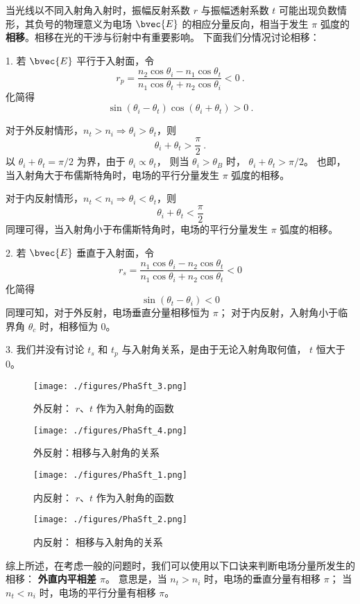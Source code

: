 
\begin{issues}
\issueMissDepend
\end{issues}


当光线以不同入射角入射时，振幅反射系数 $r$ 与振幅透射系数 $t$  可能出现负数情形，其负号的物理意义为电场 $\bvec{E}$ 的相应分量反向，相当于发生 $\pi$ 弧度的\textbf{相移}。相移在光的干涉与衍射中有重要影响。
下面我们分情况讨论相移：

1. 若 $\bvec{E}$ 平行于入射面，令
$$ r_p =  \dfrac{n_2\cos{\theta_i} - n_1\cos\theta_t}{n_1\cos\theta_t + n_2\cos\theta_i} < 0 ~.$$
化简得
$$ \sin(\theta_i - \theta_t)\cos(\theta_i + \theta_t) > 0~.$$

对于外反射情形，$n_t > n_i \Rightarrow \theta_i > \theta_t$，则
$$\theta_i + \theta_t > \frac{\pi}{2}~.$$
以 $\theta_i + \theta_t = \pi/2$ 为界，由于 $\theta_i \propto \theta_t$， 则当 $\theta_i > \theta_B$ 时， $\theta_i + \theta_t > \pi/2$。 也即，当入射角大于布儒斯特角时，电场的平行分量发生 $\pi$ 弧度的相移。

对于内反射情形，$ n_t < n_i \Rightarrow \theta_i < \theta_t$，则
$$\theta_i + \theta_t < \frac{\pi}{2}$$
同理可得，当入射角小于布儒斯特角时，电场的平行分量发生 $\pi$ 弧度的相移。

2. 若 $\bvec{E}$ 垂直于入射面，令
$$r_s  = \frac{n_1\cos{\theta_i} - n_2\cos\theta_t}{n_1\cos\theta_i + n_2\cos\theta_t} < 0$$
化简得
$$\sin(\theta_t - \theta_i) < 0$$
同理可知，对于外反射，电场垂直分量相移恒为 $\pi$； 对于内反射，入射角小于临界角 $\theta_c$ 时，相移恒为 0。

3. 我们并没有讨论 $t_s$ 和 $t_p$ 与入射角关系，是由于无论入射角取何值， $ t$ 恒大于0。

\begin{figure}[ht]
\centering
\texttt{[image: ./figures/PhaSft\_3.png]}
\caption{外反射： $r$、$t$ 作为入射角的函数} \label{PhaSft_fig3}
\end{figure}

\begin{figure}[ht]
\centering
\texttt{[image: ./figures/PhaSft\_4.png]}
\caption{外反射：相移与入射角的关系} \label{PhaSft_fig4}
\end{figure}

\begin{figure}[ht]
\centering
\texttt{[image: ./figures/PhaSft\_1.png]}
\caption{内反射：  $r$、$t$ 作为入射角的函数} \label{PhaSft_fig1}
\end{figure}

\begin{figure}[ht]
\centering
\texttt{[image: ./figures/PhaSft\_2.png]}
\caption{内反射： 相移与入射角的关系} \label{PhaSft_fig2}
\end{figure}

综上所述，在考虑一般的问题时，我们可以使用以下口诀来判断电场分量所发生的相移： 
\textbf{外直内平相差 $\pi$}。
意思是，当 $n_t > n_i$ 时，电场的垂直分量有相移 $\pi$； 当 $n_t < n_i$ 时，电场的平行分量有相移 $\pi$。
